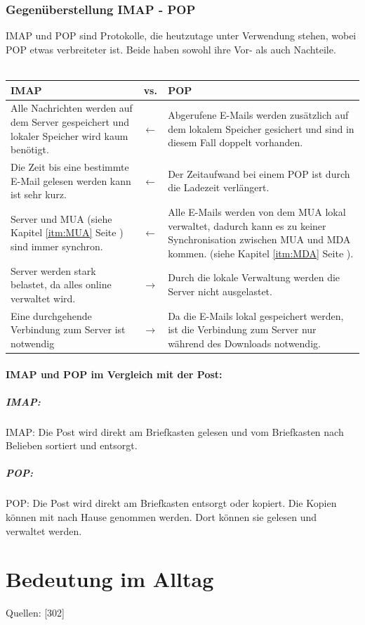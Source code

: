 \documentclass[12pt,a4paper]{report}
\begin{document}
\begin{onehalfspace}
\subsubsection{Gegenüberstellung IMAP - POP} \label{sssec:IMAPvsPOP}
IMAP und POP sind Protokolle, die heutzutage unter Verwendung stehen, wobei POP etwas verbreiteter ist. Beide haben sowohl ihre Vor- als auch Nachteile. \\\\
\begin{center}
\begin{tabular}{p{6cm}|c|p{6cm}}
\textbf{IMAP} & vs. &\textbf{POP}\\
\hline
Alle Nachrichten werden auf dem Server gespeichert und lokaler Speicher wird kaum benötigt. & $\leftarrow$ & Abgerufene E-Mails werden zusätzlich auf dem lokalem Speicher gesichert und sind in diesem Fall doppelt vorhanden. \\
\hline
Die Zeit bis eine bestimmte E-Mail gelesen werden kann ist sehr kurz. & $\leftarrow$ & Der Zeitaufwand bei einem POP ist durch die Ladezeit verlängert. \\
\hline
Server und MUA (siehe Kapitel \ref{itm:MUA} Seite \pageref{itm:MUA}) sind immer synchron. & $\leftarrow$ & Alle E-Mails werden von dem MUA lokal verwaltet, dadurch kann es zu keiner Synchronisation zwischen MUA und MDA kommen.  (siehe Kapitel \ref{itm:MDA} Seite \pageref{itm:MDA}).\\
\hline
Server werden stark belastet, da alles online verwaltet wird. & $\rightarrow$ & Durch die lokale Verwaltung werden die Server nicht ausgelastet.\\
\hline
Eine durchgehende Verbindung zum Server ist notwendig & $\rightarrow$ & Da die E-Mails lokal gespeichert werden, ist die Verbindung zum Server nur während des Downloads notwendig.
\end{tabular}
\end{center}
\paragraph{IMAP und POP im Vergleich mit der Post:}
\subparagraph{IMAP:} IMAP: Die Post wird direkt am Briefkasten gelesen und vom Briefkasten nach Belieben sortiert und entsorgt.
\subparagraph{POP:} POP: Die Post wird direkt am Briefkasten entsorgt oder kopiert. Die Kopien können mit nach Hause genommen werden. Dort können sie gelesen und verwaltet werden. 
\section{Bedeutung im Alltag}
\begin{flushright}
\begin{tiny}
Quellen: [302]
\end{tiny}
\end{flushright}

\end{onehalfspace}
\end{document}
